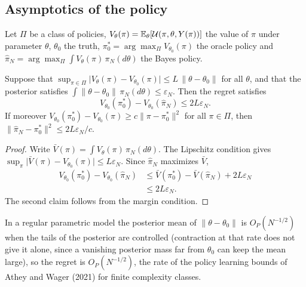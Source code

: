 \subsection{Asymptotics of the policy}\label{gbc:sec:asymptotics}

Let $\Pi$ be a class of policies, $V_\theta(\pi) = \mathbb{E}_\theta[\mathcal{U}(\pi,\theta,Y(\pi))]$ the value of $\pi$ under parameter $\theta$, $\theta_0$ the truth, $\pi_0^\ast = \arg\max_\Pi V_{\theta_0}(\pi)$ the oracle policy and $\hat\pi_N = \arg\max_\Pi \int V_\theta(\pi)\,\pi_N(d\theta)$ the Bayes policy.

\begin{proposition}\label{gbc:prop:regret}
Suppose that $\sup_{\pi\in\Pi}\lvert V_\theta(\pi) - V_{\theta_0}(\pi)\rvert \le L\,\lVert\theta-\theta_0\rVert$ for all $\theta$, and that the posterior satisfies $\int \lVert\theta-\theta_0\rVert\,\pi_N(d\theta) \le \varepsilon_N$. Then the regret satisfies
\[
V_{\theta_0}(\pi_0^\ast) - V_{\theta_0}(\hat\pi_N) \le 2L\varepsilon_N .
\]
If moreover $V_{\theta_0}(\pi_0^\ast) - V_{\theta_0}(\pi) \ge c\lVert\pi - \pi_0^\ast\rVert^2$ for all $\pi\in\Pi$, then $\lVert\hat\pi_N - \pi_0^\ast\rVert^2 \le 2L\varepsilon_N/c$.
\end{proposition}
\begin{proof}
Write $\bar V(\pi) = \int V_\theta(\pi)\,\pi_N(d\theta)$. The Lipschitz condition gives $\sup_\pi\lvert\bar V(\pi)-V_{\theta_0}(\pi)\rvert\le L\varepsilon_N$. Since $\hat\pi_N$ maximizes $\bar V$,
\[
\begin{aligned}
V_{\theta_0}(\pi_0^\ast)-V_{\theta_0}(\hat\pi_N)
&\le \bar V(\pi_0^\ast)-\bar V(\hat\pi_N)+2L\varepsilon_N\\
&\le 2L\varepsilon_N.
\end{aligned}
\]
The second claim follows from the margin condition.
\end{proof}

In a regular parametric model the posterior mean of $\lVert\theta-\theta_0\rVert$ is $O_P(N^{-1/2})$ when the tails of the posterior are controlled (contraction at that rate does not give it alone, since a vanishing posterior mass far from $\theta_0$ can keep the mean large), so the regret is $O_P(N^{-1/2})$, the rate of the policy learning bounds of Athey and Wager (2021) for finite complexity classes.

